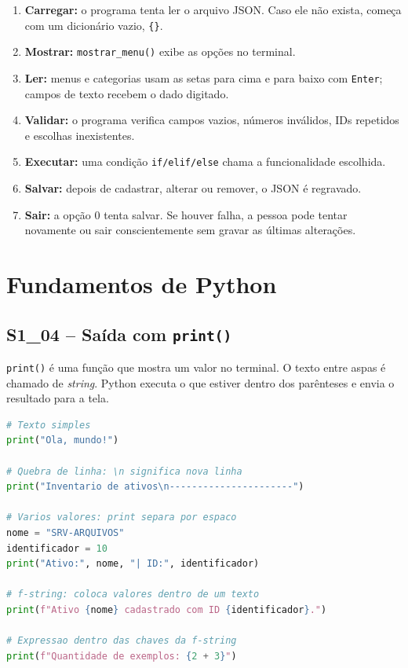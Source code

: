 \documentclass[11pt,a4paper]{article}
\newcommand{\cardsection}[1]{\Needspace{12\baselineskip}\subsection{#1}}
\begin{document}
\begin{enumerate}
  \item \textbf{Carregar:} o programa tenta ler o arquivo JSON. Caso ele não exista, começa com um dicionário vazio, \texttt{\{\}}.
  \item \textbf{Mostrar:} \texttt{mostrar\_menu()} exibe as opções no terminal.
  \item \textbf{Ler:} menus e categorias usam as setas para cima e para baixo com \texttt{Enter}; campos de texto recebem o dado digitado.
  \item \textbf{Validar:} o programa verifica campos vazios, números inválidos, IDs repetidos e escolhas inexistentes.
  \item \textbf{Executar:} uma condição \texttt{if/elif/else} chama a funcionalidade escolhida.
  \item \textbf{Salvar:} depois de cadastrar, alterar ou remover, o JSON é regravado.
  \item \textbf{Sair:} a opção 0 tenta salvar. Se houver falha, a pessoa pode tentar novamente ou sair conscientemente sem gravar as últimas alterações.
\end{enumerate}

\section{Fundamentos de Python}

\cardsection{S1\_04 -- Saída com \texttt{print()}}

\texttt{print()} é uma função que mostra um valor no terminal. O texto entre aspas é chamado de \emph{string}. Python executa o que estiver dentro dos parênteses e envia o resultado para a tela.

\begin{lstlisting}[language=Python,caption={Formas básicas de usar print}]
# Texto simples
print("Ola, mundo!")

# Quebra de linha: \n significa nova linha
print("Inventario de ativos\n----------------------")

# Varios valores: print separa por espaco
nome = "SRV-ARQUIVOS"
identificador = 10
print("Ativo:", nome, "| ID:", identificador)

# f-string: coloca valores dentro de um texto
print(f"Ativo {nome} cadastrado com ID {identificador}.")

# Expressao dentro das chaves da f-string
print(f"Quantidade de exemplos: {2 + 3}")
\end{lstlisting}
\end{document}
